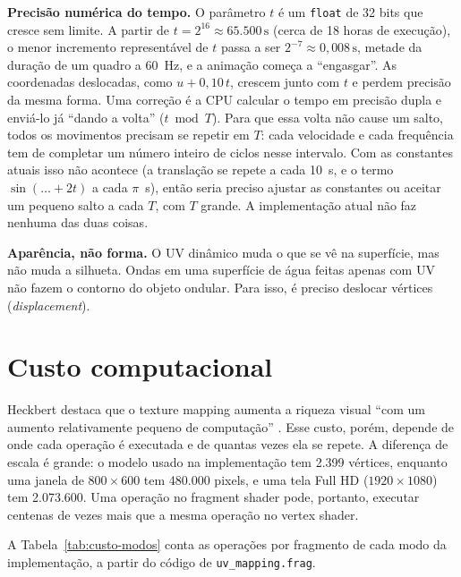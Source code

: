 \textbf{Precisão numérica do tempo.} O parâmetro \(t\) é um \texttt{float} de 32 bits que cresce sem limite. A partir de \(t = 2^{16} \approx 65.500\,\text{s}\) (cerca de 18 horas de execução), o menor incremento representável de \(t\) passa a ser \(2^{-7} \approx 0{,}008\,\text{s}\), metade da duração de um quadro a 60~Hz, e a animação começa a ``engasgar''. As coordenadas deslocadas, como \(u + 0{,}10\,t\), crescem junto com \(t\) e perdem precisão da mesma forma. Uma correção é a CPU calcular o tempo em precisão dupla e enviá-lo já ``dando a volta'' (\(t \bmod T\)). Para que essa volta não cause um salto, todos os movimentos precisam se repetir em \(T\): cada velocidade e cada frequência tem de completar um número inteiro de ciclos nesse intervalo. Com as constantes atuais isso não acontece (a translação se repete a cada 10~s, e o termo \(\sin(\ldots + 2t)\) a cada \(\pi\)~s), então seria preciso ajustar as constantes ou aceitar um pequeno salto a cada \(T\), com \(T\) grande. A implementação atual não faz nenhuma das duas coisas.

\textbf{Aparência, não forma.} O UV dinâmico muda o que se vê na superfície, mas não muda a silhueta. Ondas em uma superfície de água feitas apenas com UV não fazem o contorno do objeto ondular. Para isso, é preciso deslocar vértices (\textit{displacement}).

\section{Custo computacional}

Heckbert destaca que o texture mapping aumenta a riqueza visual ``com um aumento relativamente pequeno de computação'' \cite[p.~1]{heckbert1986}. Esse custo, porém, depende de onde cada operação é executada e de quantas vezes ela se repete. A diferença de escala é grande: o modelo usado na implementação tem 2.399 vértices, enquanto uma janela de \(800\times600\) tem 480.000 pixels, e uma tela Full HD (\(1920\times1080\)) tem 2.073.600. Uma operação no fragment shader pode, portanto, executar centenas de vezes mais que a mesma operação no vertex shader.

A Tabela~\ref{tab:custo-modos} conta as operações por fragmento de cada modo da implementação, a partir do código de \texttt{uv\_mapping.frag}.

